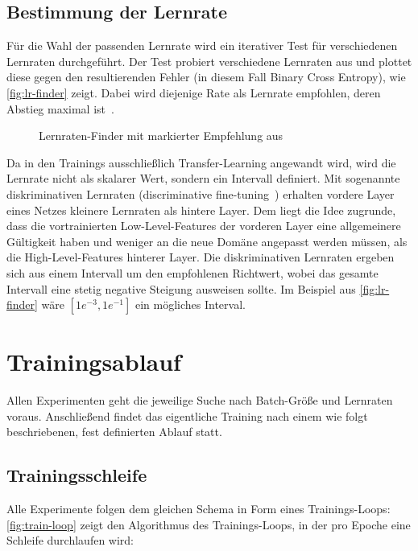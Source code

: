 \subsection{Bestimmung der Lernrate}
\label{subsec:vorkehrungen}

Für die Wahl der passenden Lernrate wird ein iterativer Test für verschiedenen Lernraten durchgeführt.
Der Test probiert verschiedene Lernraten aus und plottet diese gegen den resultierenden Fehler (in diesem Fall Binary Cross Entropy), wie \autoref{fig:lr-finder} zeigt.
Dabei wird diejenige Rate als Lernrate empfohlen, deren Abstieg maximal ist~\cite{Smith15}.

\begin{figure}
    \centering
    \caption{Lernraten-Finder mit markierter Empfehlung aus~\cite{Gugger20}}
    \label{fig:lr-finder}
\end{figure}

Da in den Trainings ausschließlich Transfer-Learning angewandt wird, wird die Lernrate nicht als skalarer Wert, sondern ein Intervall definiert.
Mit sogenannte diskriminativen Lernraten (discriminative fine-tuning~\cite{Howard18}) erhalten vordere Layer eines Netzes kleinere Lernraten als hintere Layer.
Dem liegt die Idee zugrunde, dass die vortrainierten Low-Level-Features der vorderen Layer eine allgemeinere Gültigkeit haben und weniger an die neue Domäne angepasst werden müssen, als die High-Level-Features hinterer Layer.
Die diskriminativen Lernraten ergeben sich aus einem Intervall um den empfohlenen Richtwert, wobei das gesamte Intervall eine stetig negative Steigung ausweisen sollte.
Im Beispiel aus \autoref{fig:lr-finder} wäre $[1e^{-3}, 1e^{-1}]$ ein mögliches Interval.

\section{Trainingsablauf}
\label{sec:trainingsablauf}

Allen Experimenten geht die jeweilige Suche nach Batch-Größe und Lernraten voraus.
Anschließend findet das eigentliche Training nach einem wie folgt beschriebenen, fest definierten Ablauf statt.

\subsection{Trainingsschleife}
\label{subsec:trainingsschleife}

Alle Experimente folgen dem gleichen Schema in Form eines Trainings-Loops:
\autoref{fig:train-loop} zeigt den Algorithmus des Trainings-Loops, in der pro Epoche eine Schleife durchlaufen wird:

